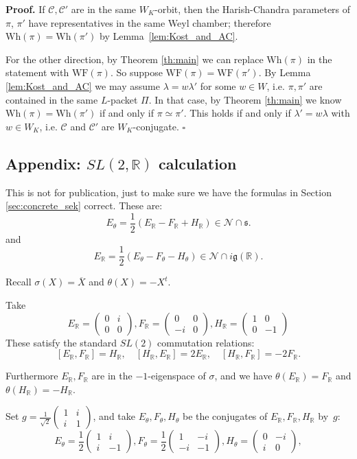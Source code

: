 \documentclass[10pt,leqno]{article}
\numberwithin{equation}{section}
\newcommand{\qed}{\hfill $\square$ \medskip}
\newenvironment{proof}[1][Proof]{\noindent\textbf{#1.} }{\qed}
\newcommand{\R}{\mathbb R}
\newcommand{\N}{\mathcal N}
\newcommand{\g}{\mathfrak g}
\newcommand{\s}{\mathfrak s}
\newcommand{\Wh}{\mathrm{Wh}}
\newcommand{\WF}{\mathrm{WF}}
\begin{document}
\begin{proof}
If  $\mathscr{C}, \mathscr{C}'$ are in the same $W_K$-orbit, then the Harish-Chandra parameters of $\pi$, $\pi'$ have representatives in the same Weyl chamber; therefore $\Wh(\pi)=\Wh(\pi')$ by Lemma~\ref{lem:Kost_and_AC}.

For the other direction, by Theorem \ref{th:main} we can replace
$\Wh(\pi)$ in the statement with $\WF(\pi)$.  So suppose
$\WF(\pi)=\WF(\pi')$. By Lemma \ref{lem:Kost_and_AC} we may assume
$\lambda=w\lambda'$ for some $w\in W$, i.e. $\pi,\pi'$ are contained
in the same $L$-packet $\Pi$. In that case, by Theorem \ref{th:main} 
we know $\Wh(\pi)=\Wh(\pi')$ if and only if $\pi\simeq \pi'$.
This holds if and only if $\lambda'=w\lambda$ with $w\in W_K$, 
i.e. $\mathscr{C}$ and $\mathscr{C}'$ are $W_K$-conjugate.
\end{proof}

\subsection{Appendix: $SL(2,\R)$ calculation}

This is not for publication, just to make sure we have the formulas in Section \ref{sec:concrete_sek} correct.
These are:
$$
E_\theta=\frac12(E_\R-F_\R+H_\R)\in \N\cap \s.
$$
and
$$
E_\R=\frac 12(E_\theta-F_\theta-H_\theta)\in\N\cap i\g(\R).
$$

Recall $\sigma(X)=\overline X$ and $\theta(X)=-X^t$.

Take
$$
E_\R=\begin{pmatrix}0&i\\0&0\end{pmatrix},
F_\R=\begin{pmatrix}0&0\\-i&0\end{pmatrix},
H_\R=\begin{pmatrix}1&0\\0&-1\end{pmatrix}
$$
These satisfy the standard $SL(2)$ commutation relations: 
\[ [E_\R, F_\R] = H_\R, \quad [H_\R, E_\R] = 2E_\R, \quad [H_\R, F_\R] = -2F_\R. \]

Furthermore $E_\R,F_\R$ are in the $-1$-eigenspace of $\sigma$,
and  we have $\theta(E_\R)=F_\R$ and $\theta(H_\R)=-H_\R$.

Set $g=\frac 1{\sqrt 2}\begin{pmatrix}1&i\\i&1
\end{pmatrix}$, and take $E_\theta,F_\theta,H_\theta$ be the conjugates of $E_\R,F_\R,H_\R$ by~$g$:
$$
E_\theta=\frac12\begin{pmatrix}1&i\\i&-1\end{pmatrix},
F_\theta=\frac12\begin{pmatrix}1&-i\\-i&-1\end{pmatrix},
H_\theta=\begin{pmatrix}0&-i\\i&0\end{pmatrix},
$$
\end{document}
